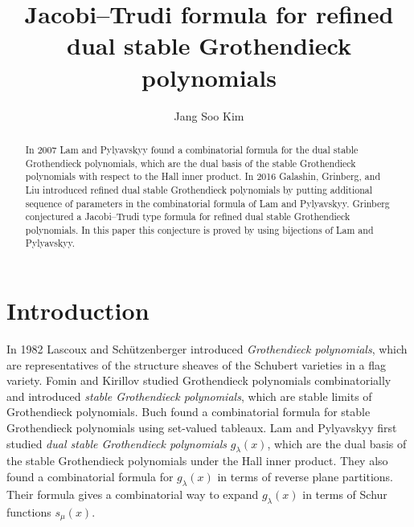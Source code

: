 \documentclass{amsart}
\title{Jacobi--Trudi formula for refined dual stable Grothendieck polynomials}
\author{Jang Soo Kim}
\numberwithin{equation}{section}
\theoremstyle{definition}
\begin{document}
\begin{abstract}
  In 2007 Lam and Pylyavskyy found a combinatorial formula for the dual stable
  Grothendieck polynomials, which are the dual basis of the stable Grothendieck
  polynomials with respect to the Hall inner product. In 2016 Galashin,
  Grinberg, and Liu introduced refined dual stable Grothendieck polynomials by
  putting additional sequence of parameters in the combinatorial formula of Lam
  and Pylyavskyy. Grinberg conjectured a Jacobi--Trudi type formula for refined
  dual stable Grothendieck polynomials. In this paper this conjecture is proved
  by using bijections of Lam and Pylyavskyy.
\end{abstract}

\maketitle

\section{Introduction}


In 1982 Lascoux and Sch\"utzenberger \cite{LS1982} introduced \emph{Grothendieck
  polynomials}, which are representatives of the structure sheaves of the
Schubert varieties in a flag variety. Fomin and Kirillov \cite{FK1996} studied
Grothendieck polynomials combinatorially and introduced \emph{stable
  Grothendieck polynomials}, which are stable limits of Grothendieck
polynomials. Buch \cite{Buch2002} found a combinatorial formula for stable
Grothendieck polynomials using set-valued tableaux. Lam and Pylyavskyy
\cite{LP2007} first studied \emph{dual stable Grothendieck polynomials}
$g_\lambda(x)$, which are the dual basis of the stable Grothendieck polynomials
under the Hall inner product. They also found a combinatorial formula for
$g_\lambda(x)$ in terms of reverse plane partitions. Their formula gives a
combinatorial way to expand $g_\lambda(x)$ in terms of Schur functions
$s_\mu(x)$.
\end{document}
